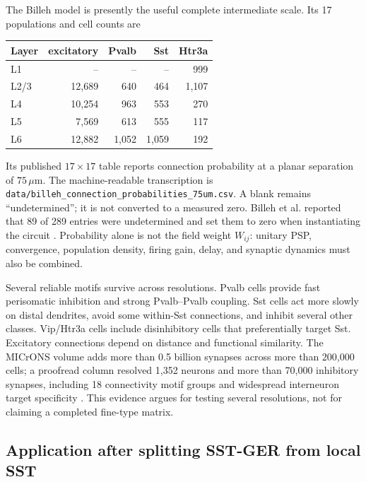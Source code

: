 \documentclass[11pt]{article}
\begin{document}
The Billeh model is presently the useful complete intermediate scale.  Its 17
populations and cell counts are
\begin{center}
\begin{tabular}{@{}lrrrr@{}}
\toprule
Layer & excitatory & Pvalb & Sst & Htr3a\\
\midrule
L1   & --     & --   & --   & 999\\
L2/3 & 12,689 & 640  & 464  & 1,107\\
L4   & 10,254 & 963  & 553  & 270\\
L5   & 7,569  & 613  & 555  & 117\\
L6   & 12,882 & 1,052& 1,059& 192\\
\bottomrule
\end{tabular}
\end{center}
Its published $17\times17$ table reports connection probability at a planar
separation of $75\,\mu$m.  The machine-readable transcription is
\texttt{data/billeh\_connection\_probabilities\_75um.csv}.  A blank remains
``undetermined''; it is not converted to a measured zero.  Billeh et al.
reported that 89 of 289 entries were undetermined and set them to zero when
instantiating the circuit \cite{billeh2020}.  Probability alone is not the
field weight $W_{ij}$: unitary PSP, convergence, population density, firing
gain, delay, and synaptic dynamics must also be combined.

Several reliable motifs survive across resolutions.  Pvalb cells provide
fast perisomatic inhibition and strong Pvalb--Pvalb coupling.  Sst cells act
more slowly on distal dendrites, avoid some within-Sst connections, and
inhibit several other classes.  Vip/Htr3a cells include disinhibitory cells
that preferentially target Sst.  Excitatory connections depend on distance
and functional similarity.  The MICrONS volume adds more than 0.5 billion
synapses across more than 200,000 cells; a proofread column resolved 1,352
neurons and more than 70,000 inhibitory synapses, including 18 connectivity
motif groups and widespread interneuron target specificity
\cite{microns2025,schneidermizell2025}.  This evidence argues for testing
several resolutions, not for claiming a completed fine-type matrix.

\subsection{Application after splitting SST-GER from local SST}
\end{document}
